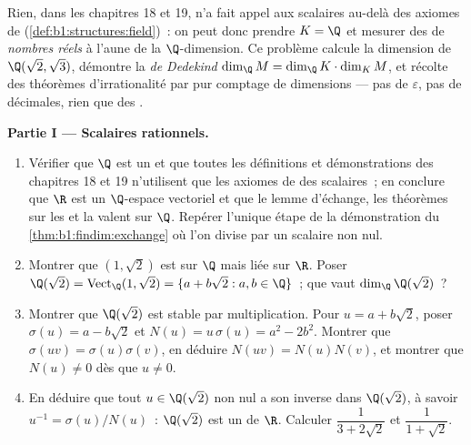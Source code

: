 \begin{problem}\label{pb:b1:findim:1}
Rien, dans les chapitres 18 et 19, n'a fait appel aux scalaires au-delà
des axiomes de  (\cref{def:b1:structures:field})~: on peut donc
prendre $K = \Q$ et mesurer des  de \emph{nombres réels} à
l'aune de la $\Q$-dimension. Ce problème calcule la
dimension de $\Q(\sqrt2, \sqrt3)$, démontre la \emph{ de Dedekind} $\dim_\Q M = \dim_\Q K \cdot \dim_K M$, et
récolte des théorèmes d'irrationalité par pur comptage de dimensions
--- pas de $\varepsilon$, pas de décimales, rien que des
.

\medskip
\noindent\textbf{Partie I --- Scalaires rationnels.}
\begin{enumerate}
  \item Vérifier que $\Q$ est un  et que toutes les définitions
        et démonstrations des chapitres 18 et 19 n'utilisent que les
        axiomes de  des scalaires~; en conclure que $\R$ est un
        $\Q$-espace vectoriel et que le lemme d'échange, les théorèmes
        sur les  et la  valent sur $\Q$.
        Repérer l'unique étape de la démonstration du
        \cref{thm:b1:findim:exchange} où l'on divise par un scalaire
        non nul.
  \item Montrer que $(1, \sqrt2)$ est  sur $\Q$ mais liée sur
        $\R$. Poser $\Q(\sqrt2) = \operatorname{Vect}_\Q(1,
        \sqrt2) = \{a + b\sqrt2 : a, b \in \Q\}$~; que vaut
        $\dim_\Q \Q(\sqrt2)$~?
  \item Montrer que $\Q(\sqrt2)$ est stable par multiplication.
        Pour $u = a + b\sqrt2$, poser $\sigma(u) = a - b\sqrt2$ et
        $N(u) = u\,\sigma(u) = a^2 - 2b^2$. Montrer que $\sigma(uv) =
        \sigma(u)\sigma(v)$, en déduire $N(uv) = N(u)N(v)$, et montrer
        que $N(u) \neq 0$ dès que $u \neq 0$.
  \item En déduire que tout $u \in \Q(\sqrt2)$ non nul a son inverse
        dans $\Q(\sqrt2)$, à savoir $u^{-1} =
        \sigma(u)/N(u)$~: $\Q(\sqrt2)$ est un  de $\R$.
        Calculer $\dfrac1{3 + 2\sqrt2}$ et $\dfrac1{1 + \sqrt2}$.
\end{enumerate}


\end{problem}
